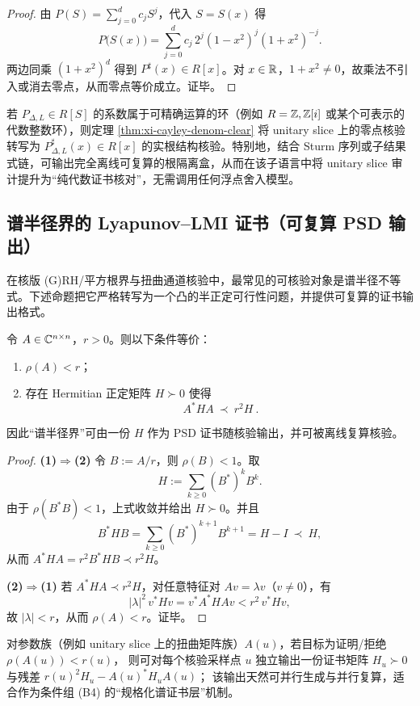 \begin{proof}
由 $P(S)=\sum_{j=0}^{d}c_j S^j$，代入 $S=S(x)$ 得
$$
P\bigl(S(x)\bigr)=\sum_{j=0}^{d}c_j\,2^j(1-x^2)^j(1+x^2)^{-j}.
$$
两边同乘 $(1+x^2)^d$ 得到 $P^\sharp(x)\in R[x]$。对 $x\in\mathbb{R}$，$1+x^2\neq 0$，故乘法不引入或消去零点，从而零点等价成立。证毕。
\end{proof}

\begin{remark}\label{rem:xi-zero-float-audit}
若 $P_{\Delta,L}\in R[S]$ 的系数属于可精确运算的环（例如 $R=\mathbb{Z},\mathbb{Z}[i]$ 或某个可表示的代数整数环），则定理 \ref{thm:xi-cayley-denom-clear} 将 unitary slice 上的零点核验转写为 $P_{\Delta,L}^\sharp(x)\in R[x]$ 的实根结构核验。特别地，结合 Sturm 序列或子结果式链，可输出完全离线可复算的根隔离盒，从而在该子语言中将 unitary slice 审计提升为“纯代数证书核对”，无需调用任何浮点舍入模型。
\end{remark}

\subsection{谱半径界的 Lyapunov--LMI 证书（可复算 PSD 输出）}\label{subsec:lyapunov-lmi-certificate}
在核版 (G)RH/平方根界与扭曲通道核验中，最常见的可核验对象是谱半径不等式。下述命题把它严格转写为一个凸的半正定可行性问题，并提供可复算的证书输出格式。

\begin{proposition}\label{prop:lyapunov-spectral-radius-certificate}
令 $A\in\mathbb{C}^{n\times n}$，$r>0$。则以下条件等价：
\begin{enumerate}
  \item $\rho(A)<r$；
  \item 存在 Hermitian 正定矩阵 $H\succ 0$ 使得
  $$
  \boxed{\ A^\ast H A\ \prec\ r^2 H\ }.
  $$
\end{enumerate}
因此“谱半径界”可由一份 $H$ 作为 PSD 证书随核验输出，并可被离线复算核验。
\end{proposition}
\begin{proof}
\textbf{(1)$\Rightarrow$(2)} 令 $B:=A/r$，则 $\rho(B)<1$。取
$$
H:=\sum_{k\ge 0}(B^\ast)^k B^k.
$$
由于 $\rho(B^\ast B)<1$，上式收敛并给出 $H\succ 0$。并且
$$
B^\ast H B=\sum_{k\ge 0}(B^\ast)^{k+1}B^{k+1}=H-I\ \prec\ H,
$$
从而 $A^\ast H A=r^2 B^\ast H B\prec r^2 H$。

\textbf{(2)$\Rightarrow$(1)} 若 $A^\ast H A\prec r^2 H$，对任意特征对 $Av=\lambda v$（$v\neq 0$），有
$$
|\lambda|^2\,v^\ast H v=v^\ast A^\ast H A v<r^2\,v^\ast H v,
$$
故 $|\lambda|<r$，从而 $\rho(A)<r$。证毕。
\end{proof}

\begin{remark}[并行核验与证书物]\label{rem:lyapunov-audit-parallel}
对参数族（例如 unitary slice 上的扭曲矩阵族）$A(u)$，若目标为证明/拒绝
$
\rho(A(u))<r(u)
$，
则可对每个核验采样点 $u$ 独立输出一份证书矩阵 $H_u\succ 0$ 与残差
$
r(u)^2H_u-A(u)^\ast H_u A(u)
$；
该输出天然可并行生成与并行复算，适合作为条件组 (B4) 的“规格化谱证书层”机制。
\end{remark}


